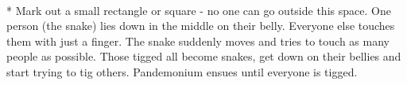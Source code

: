 \begin{minipage}{\textwidth}
\\*
Mark out a small rectangle or square - no one can go outside this space. One person (the snake) lies down in the middle on their belly. Everyone else touches them with just a finger. The snake suddenly moves and tries to touch as many people as possible. Those tigged all become snakes, get down on their bellies and start trying to tig others. Pandemonium ensues until everyone is tigged.
\end{minipage}    \vfill
